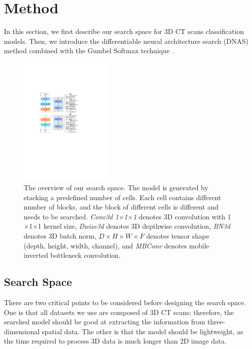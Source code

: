 \documentclass[letterpaper]{article}
\begin{document}
\section{Method}
\label{section:method}



In this section, we first describe our search space for 3D CT scans classification models. Then, we introduce the differentiable neural architecture search (DNAS) method combined with the Gumbel Softmax technique \cite{Gumbel_Softmax,gdas}.


\begin{figure}[!ht]
    \centering
    \includegraphics[width=0.4\textwidth, height=0.45\textwidth]{images/mnasnet_new.pdf}
    \caption{The overview of our search space. The model is generated by stacking a predefined number of cells. Each cell contains different number of blocks, and the block of different cells is different and needs to be searched. \textit{Conv3d 1$\times$1$\times$1} denotes 3D convolution with 1$\times$1$\times$1 kernel size, \textit{Dwise3d} denotes 3D depthwise convolution, \textit{BN3d} denotes 3D batch norm, $D\times H\times W\times F$ denotes tensor shape (depth, height, width, channel), and \textit{MBConv} denotes mobile inverted bottleneck convolution.}
    \label{fig:search_space}
\end{figure}


\subsection{Search Space}

There are two critical points to be considered before designing the search space. One is that all datasets we use are composed of 3D CT scans; therefore, the searched model should be good at extracting the information from three-dimensional spatial data. The other is that the model should be lightweight, as the time required to process 3D data is much longer than 2D image data.
\end{document}
